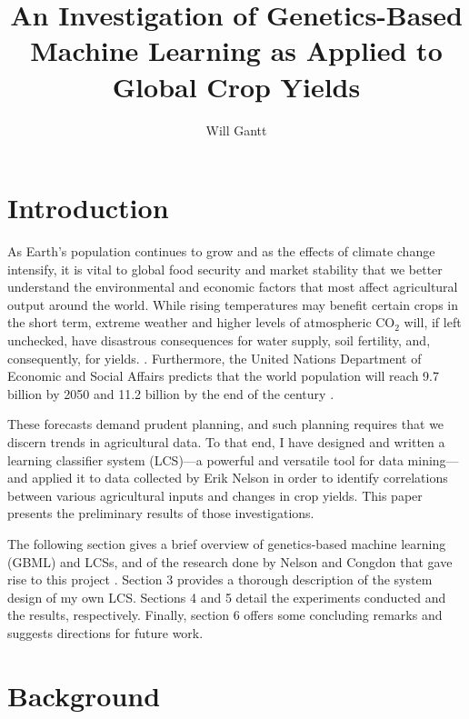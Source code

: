 \documentclass[11pt]{article}
\begin{document}
\title{An Investigation of Genetics-Based Machine Learning as Applied to Global Crop Yields}
\author{Will Gantt}
\maketitle

\section{Introduction}

As Earth's population continues to grow and as the effects of climate change intensify, it is vital to global food security and market stability that we better understand the environmental and economic factors that most affect agricultural output around the world. While rising temperatures may benefit certain crops in the short term, extreme weather and higher levels of atmospheric $\text{CO}_2$ will, if left unchecked,  have disastrous consequences for water supply, soil fertility, and, consequently, for yields. \cite{us_epa_climate_2017}. Furthermore, the United Nations Department of Economic and Social Affairs predicts that the world population will reach 9.7 billion by 2050 and 11.2 billion by the end of the century \cite{noauthor_world_2015}.

These forecasts demand prudent planning, and such planning requires that we discern trends in agricultural data. To that end, I have designed and written a learning classifier system (LCS)---a powerful and versatile tool  for data mining---and applied it to data collected by Erik Nelson in order to identify correlations between various agricultural inputs and changes in crop yields.
This paper presents the preliminary results of those investigations.

The following section gives a brief overview of genetics-based machine learning (GBML) and LCSs, and of the research done by Nelson and Congdon that gave rise to this project \cite{nelson_measuring_2016}. Section 3 provides a thorough description of the system design of my own LCS. Sections 4 and 5 detail the experiments conducted and the results, respectively. Finally, section 6 offers some concluding remarks and suggests directions for future work.

\section{Background}
\end{document}
